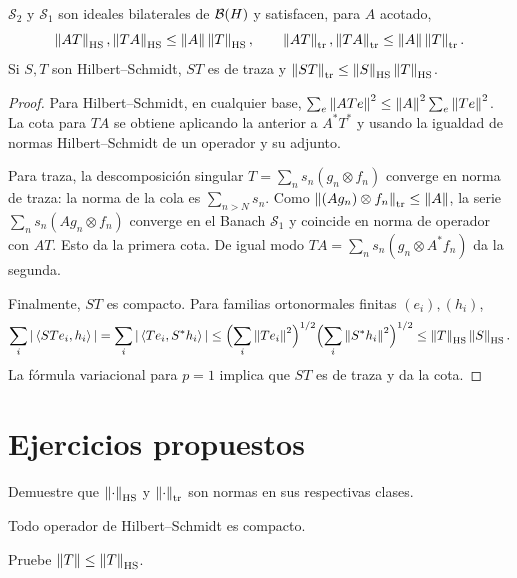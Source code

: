 \begin{proposicion}\label{v3:ideales-hs-traza}
$\mathcal S_2$ y $\mathcal S_1$ son ideales bilaterales de $\mathcal B(H)$ y satisfacen, para $A$ acotado,
\[\left\lVert AT\right\rVert_{\mathrm{HS}},\left\lVert TA\right\rVert_{\mathrm{HS}}\le\left\lVert A\right\rVert\left\lVert T\right\rVert_{\mathrm{HS}},
\qquad
\left\lVert AT\right\rVert_{\mathrm{tr}},\left\lVert TA\right\rVert_{\mathrm{tr}}\le\left\lVert A\right\rVert\left\lVert T\right\rVert_{\mathrm{tr}}.
\]
Si $S,T$ son Hilbert--Schmidt, $ST$ es de traza y $\left\lVert ST\right\rVert_{\mathrm{tr}}\le\left\lVert S\right\rVert_{\mathrm{HS}}\left\lVert T\right\rVert_{\mathrm{HS}}$.
\end{proposicion}
\begin{proof}
Para Hilbert--Schmidt, en cualquier base,
$\sum_e\left\lVert ATe\right\rVert^2\le\left\lVert A\right\rVert^2\sum_e\left\lVert Te\right\rVert^2$. La cota para $TA$ se obtiene aplicando la anterior a $A^*T^*$ y usando la igualdad de normas Hilbert--Schmidt de un operador y su adjunto.

Para traza, la descomposición singular $T=\sum_ns_n(g_n\otimes f_n)$ converge en norma de traza: la norma de la cola es $\sum_{n>N}s_n$. Como $\left\lVert(Ag_n)\otimes f_n\right\rVert_{\mathrm{tr}}\le\left\lVert A\right\rVert$, la serie $\sum_ns_n(Ag_n\otimes f_n)$ converge en el Banach $\mathcal S_1$ y coincide en norma de operador con $AT$. Esto da la primera cota. De igual modo $TA=\sum_ns_n(g_n\otimes A^*f_n)$ da la segunda.

Finalmente, $ST$ es compacto. Para familias ortonormales finitas $(e_i),(h_i)$,
\[\sum_i|\left\langle STe_i,h_i\right\rangle|=\sum_i|\left\langle Te_i,S^*h_i\right\rangle|
\le\Bigl(\sum_i\left\lVert Te_i\right\rVert^2\Bigr)^{1/2}
\Bigl(\sum_i\left\lVert S^*h_i\right\rVert^2\Bigr)^{1/2}
\le\left\lVert T\right\rVert_{\mathrm{HS}}\left\lVert S\right\rVert_{\mathrm{HS}}.
\]
La fórmula variacional para $p=1$ implica que $ST$ es de traza y da la cota.
\end{proof}

\section{Ejercicios propuestos}
\begin{ejercicio}\label{ej:v3-l12-1}
Demuestre que $\left\lVert\cdot\right\rVert_{\mathrm{HS}}$ y $\left\lVert\cdot\right\rVert_{\mathrm{tr}}$ son normas en sus respectivas clases.
\end{ejercicio}


\begin{ejercicio}\label{ej:v3-l12-2}
Todo operador de Hilbert--Schmidt es compacto.
\end{ejercicio}


\begin{ejercicio}\label{ej:v3-l12-3}
Pruebe $\left\lVert T\right\rVert\le\left\lVert T\right\rVert_{\mathrm{HS}}$.
\end{ejercicio}


